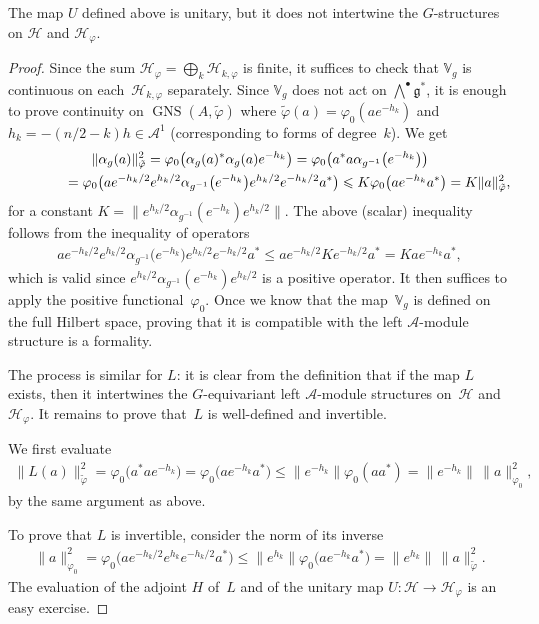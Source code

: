\documentclass[pdftex]{sigma}
\newcommand{\Aa}{\mathcal{A}}
\newcommand{\Hh}{\mathscr{H}}
\newcommand{\LieG}{\mathfrak{g}}
\newcommand{\RepV}{\mathbb{V}}
\DeclareMathOperator{\GNS}{GNS}
\numberwithin{equation}{section}
\begin{document}
\begin{Remark}
The map $U$ def\/ined above is unitary, but it does not intertwine the $G$-structures on $\Hh$ and $\Hh_\varphi$.
\end{Remark}

\begin{proof}
Since the sum $\Hh_{\varphi} = \bigoplus_k \Hh_{k, \varphi}$ is f\/inite, it suf\/f\/ices to check that $\RepV_g$ is continuous on each~$\Hh_{k, \varphi}$ separately. Since $\RepV_g$ does not act on $\bigwedge^\bullet \LieG^*$, it is enough to prove continuity on $\GNS(A, \tilde{\varphi})$ where $\tilde{\varphi}(a) = \varphi_0(a e^{-h_k})$ and $h_k = -(n/2 -k)h \in \Aa^1$ (corresponding to forms of degree~$k$). We get
\begin{gather*}
\| \alpha_g(a) \|_{\tilde{\varphi}}^2 = \varphi_0\big( \alpha_g(a)^* \alpha_g(a) e^{-h_k} \big) = \varphi_0\big( a^* a \alpha_{g^{-1}}\big(e^{-h_k}\big) \big) \\
\hphantom{\| \alpha_g(a) \|_{\tilde{\varphi}}^2}{}
= \varphi_0\big( a e^{-h_k/2} e^{h_k/2}\alpha_{g^{-1}}\big(e^{-h_k}\big)e^{h_k/2} e^{-h_k/2} a^*\big) \leqslant K \varphi_0\big( a e^{-h_k}a^*\big) = K \| a \|_{\tilde{\varphi}}^2,
\end{gather*}
for a constant $K = \| e^{h_k/2}\alpha_{g^{-1}}(e^{-h_k})e^{h_k/2} \|$. The above (scalar) inequality follows from the inequality of operators
\begin{gather*}
a e^{-h_k/2} e^{h_k/2}\alpha_{g^{-1}}\big(e^{-h_k}\big)e^{h_k/2} e^{-h_k/2} a^* \leqslant a e^{-h_k/2} K e^{-h_k/2} a^* = K a e^{-h_k} a^*,
\end{gather*}
which is valid since $e^{h_k/2}\alpha_{g^{-1}}(e^{-h_k})e^{h_k/2}$ is a positive operator. It then suf\/f\/ices to apply the positive functional~$\varphi_0$. Once we know that the map~$\RepV_g$ is def\/ined on the full Hilbert space, proving that it is compatible with the left $\Aa$-module structure is a formality.

The process is similar for $L$: it is clear from the def\/inition that if the map $L$ exists, then it intertwines the $G$-equivariant left $\Aa$-module structures on~$\Hh$ and~$\Hh_\varphi$. It remains to prove that~$L$ is well-def\/ined and invertible.

We f\/irst evaluate
\begin{gather*}
\| L( a) \|_{\tilde{\varphi}}^2 = \varphi_0\big( a^* a e^{-h_k}\big) = \varphi_0\big( a e^{-h_k} a^*\big) \leqslant \big\| e^{-h_k} \big\| \varphi_0(a a^*) = \big\| e^{-h_k} \big\| \, \| a \|_{\varphi_0}^2,
\end{gather*}
by the same argument as above.

To prove that $L$ is invertible, consider the norm of its inverse
\begin{gather*}
\| a \|_{\varphi_0}^2 = \varphi_0\big( a e^{-h_k/2} e^{h_k} e^{-h_k/2} a^*\big) \leqslant \big\| e^{h_k} \big\| \varphi_0\big( a e^{-h_k} a^*\big) = \big\|e^{h_k} \big\| \, \| a \|_{\tilde{\varphi}}^2.
\end{gather*}
The evaluation of the adjoint $H$ of~$L$ and of the unitary map $U \colon \Hh \to \Hh_\varphi$ is an easy exercise.
\end{proof}
\end{document}
